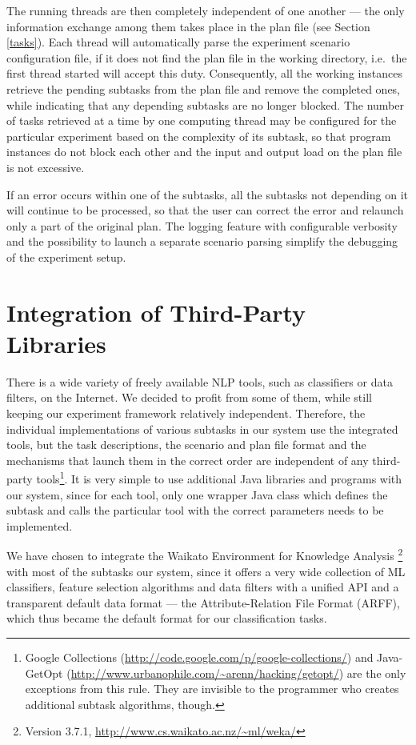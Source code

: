 \documentclass[12pt,notitlepage]{report}
\begin{document}
The running threads are then completely independent of one another --- the only information exchange among them takes place in the plan file (see Section \ref{tasks}). Each thread will automatically parse the experiment scenario configuration file, if it does not find the plan file in the working directory, i.e.\ the first thread started will accept this duty. Consequently, all the working instances retrieve the pending subtasks from the plan file and remove the completed ones, while indicating that any depending subtasks are no longer blocked. The number of tasks retrieved at a time by one computing thread may be configured for the particular experiment based on the complexity of its subtask, so that program instances do not block each other and the input and output load on the plan file is not excessive.

If an error occurs within one of the subtasks, all the subtasks not depending on it will continue to be processed, so that the user can correct the error and relaunch only a part of the original plan. The logging feature with configurable verbosity and the possibility to launch a separate scenario parsing simplify the debugging of the experiment setup.

\section{Integration of Third-Party Libraries}\label{weka}

There is a wide variety of freely available NLP tools, such as classifiers or data filters, on the Internet. We decided to profit from some of them, while still keeping our experiment framework relatively independent. Therefore, the individual implementations of various subtasks in our system use the integrated tools, but the task descriptions, the scenario and plan file format and the mechanisms that launch them in the correct order are independent of any third-party tools\footnote{Google Collections (\url{http://code.google.com/p/google-collections/}) and Java-GetOpt (\url{http://www.urbanophile.com/\~arenn/hacking/getopt/}) are the only exceptions from this rule. They are invisible to the programmer who creates additional subtask algorithms, though.}. It is very simple to use additional Java libraries and programs with our system, since for each tool, only one wrapper Java class which defines the subtask and calls the particular tool with the correct parameters needs to be implemented.

We have chosen to integrate the Waikato Environment for Knowledge Analysis \citep[WEKA, ][]{garner95}\footnote{Version 3.7.1, \url{http://www.cs.waikato.ac.nz/~ml/weka/}} with most of the subtasks our system, since it offers a very wide collection of ML classifiers, feature selection algorithms and data filters with a unified API and a transparent default data format --- the Attribute-Relation File Format (ARFF), which thus became the default format for our classification tasks.
\end{document}
